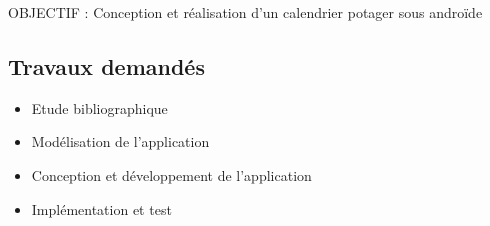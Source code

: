 \documentclass[10pt]{article}
\begin{document}
OBJECTIF : Conception et réalisation d’un calendrier potager sous androïde  

\subsection*{Travaux demand{\'e}s}
\begin{itemize}
	\item Etude bibliographique
	\item Modélisation de l’application
	\item Conception et développement de l’application
	\item Implémentation et test 
\end{itemize}




\end{document}
